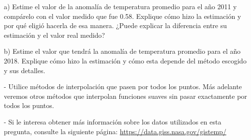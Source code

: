 \documentclass[letter, 11pt]{article}
\begin{document}
\vspace{0.5em}
\noindent a) Estime el valor de la anomalía de temperatura promedio para el año
2011 y compárelo con el valor medido que fue 0.58. Explique cómo hizo la
estimación y por qué eligió hacerla de esa manera. ¿Puede explicar la
diferencia entre su estimación y el valor real medido?

\vspace{0.5em}
\noindent b) Estime el valor que tendrá la anomalía de temperatura promedio
para el año 2018. Explique cómo hizo la estimación y cómo esta depende del
método escogido y sus detalles.

\begin{ayuda}
  - Utilice métodos de interpolación que pasen por todos los puntos. Más
  adelante veremos otros métodos que interpolan funciones suaves sin pasar
  exactamente por todos los puntos.

  \noindent- Si le interesa obtener más información sobre los datos utilizados
  en esta pregunta, consulte la siguiente página:
  \href{https://data.giss.nasa.gov/gistemp/}{https://data.giss.nasa.gov/gistemp/}
\end{ayuda}
\end{document}
